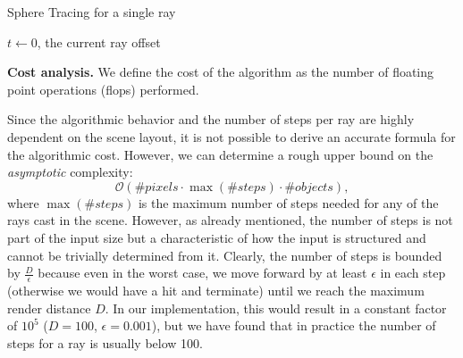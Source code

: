 \documentclass[letterpaper]{article}
\newcommand{\mypar}[1]{{\bf #1.}}
\begin{document}
\begin{algorithm}[ht]
    \caption{Sphere Tracing for a single ray\label{algo:naive}}
    \DontPrintSemicolon

    \BlankLine
    
    \(t \leftarrow 0\), the current ray offset\;
\end{algorithm}

\mypar{Cost analysis}
We define the cost of the algorithm as the number of floating point operations (flops) performed.

Since the algorithmic behavior and the number of steps per ray are highly dependent on the scene layout, 
it is not possible to derive an accurate formula for the algorithmic cost.
However, we can determine a rough upper bound on the \emph{asymptotic} complexity:
\[
\mathcal{O}(\#pixels \cdot \max(\#steps) \cdot \#objects),
\]
where $\max(\#steps)$ is the maximum number of steps needed for any of the rays cast in the scene. 
However, as already mentioned, the number of steps is not part of the input size but a characteristic of how the input is structured
and cannot be trivially determined from it.
Clearly, the number of steps is bounded by $\frac{D}{\epsilon}$ because even in the worst case, 
we move forward by at least $\epsilon$ in each step (otherwise we would have a hit and terminate) until we reach the maximum render distance $D$.
In our implementation, this would result in a constant factor of $10^5$ ($D = 100$, $\epsilon = 0.001$), but we have found that in practice the number of steps for a ray is usually below 100.
\end{document}
